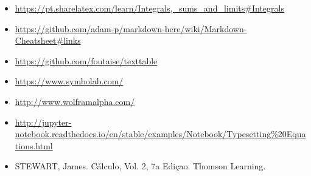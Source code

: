 \documentclass[11pt]{article}
\providecommand{\tightlist}{%
      \setlength{\itemsep}{0pt}\setlength{\parskip}{0pt}}
\begin{document}
    \begin{itemize}
\tightlist
\item
  \url{https://pt.sharelatex.com/learn/Integrals,_sums_and_limits\#Integrals}
\item
  \url{https://github.com/adam-p/markdown-here/wiki/Markdown-Cheatsheet\#links}
\item
  \url{https://github.com/foutaise/texttable}
\item
  \url{https://www.symbolab.com/}
\item
  \url{http://www.wolframalpha.com/}
\item
  \url{http://jupyter-notebook.readthedocs.io/en/stable/examples/Notebook/Typesetting\%20Equations.html}
\item
  STEWART, James. Cálculo, Vol. 2, 7a Ediçao. Thomson Learning.
\end{itemize}


    
    
    
    
\end{document}
